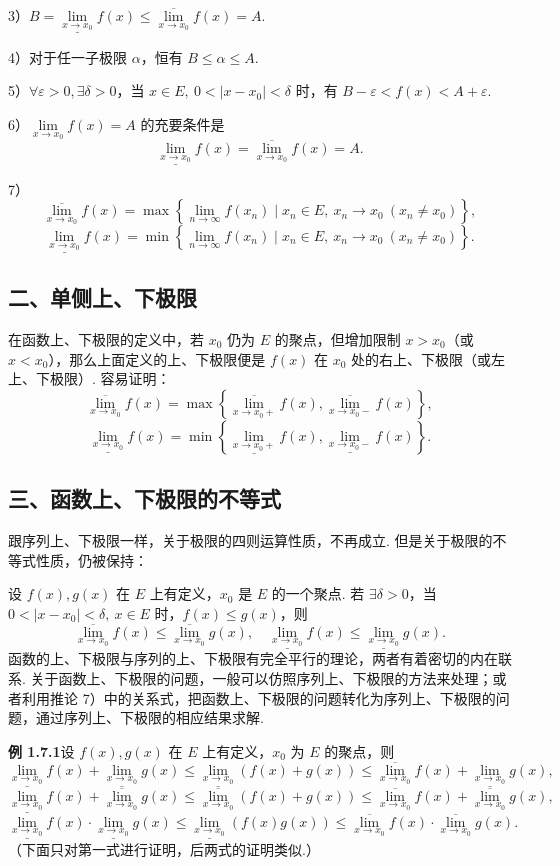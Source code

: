 \documentclass[UTF8,12pt,a4paper,fontset=fandol]{ctexart}
\begin{document}
3）$B=\underline{\lim\limits_{x\to x_0}}f(x)\le \overline{\lim\limits_{x\to x_0}}f(x)=A$.

4）对于任一子极限 $\alpha$，恒有 $B\le\alpha\le A$.

5）$\forall \varepsilon>0,\exists\delta>0$，当 $x\in E,\ 0<|x-x_0|<\delta$ 时，有 $B-\varepsilon<f(x)<A+\varepsilon$.

6）$\lim\limits_{x\to x_0}f(x)=A$ 的充要条件是
\[
  \underline{\lim_{x\to x_0}}f(x)=\overline{\lim_{x\to x_0}}f(x)=A.
\]

7）
\[
  \overline{\lim_{x\to x_0}}f(x)
  =\max\left\{\lim_{n\to\infty}f(x_n)\mid x_n\in E,\ x_n\to x_0\ (x_n\ne x_0)\right\},
\]
\[
  \underline{\lim_{x\to x_0}}f(x)
  =\min\left\{\lim_{n\to\infty}f(x_n)\mid x_n\in E,\ x_n\to x_0\ (x_n\ne x_0)\right\}.
\]

\subsection*{二、单侧上、下极限}

在函数上、下极限的定义中，若 $x_0$ 仍为 $E$ 的聚点，但增加限制 $x>x_0$（或 $x<x_0$），那么上面定义的上、下极限便是 $f(x)$ 在 $x_0$ 处的右上、下极限（或左上、下极限）. 容易证明：
\[
  \overline{\lim_{x\to x_0}}f(x)
  =\max\left\{\overline{\lim_{x\to x_0+}}f(x),\overline{\lim_{x\to x_0-}}f(x)\right\},
\]
\[
  \underline{\lim_{x\to x_0}}f(x)
  =\min\left\{\underline{\lim_{x\to x_0+}}f(x),\underline{\lim_{x\to x_0-}}f(x)\right\}.
\]

\subsection*{三、函数上、下极限的不等式}

跟序列上、下极限一样，关于极限的四则运算性质，不再成立. 但是关于极限的不等式性质，仍被保持：

设 $f(x),g(x)$ 在 $E$ 上有定义，$x_0$ 是 $E$ 的一个聚点. 若 $\exists\delta>0$，当 $0<|x-x_0|<\delta,\ x\in E$ 时，$f(x)\le g(x)$，则
\[
  \overline{\lim_{x\to x_0}}f(x)\le \overline{\lim_{x\to x_0}}g(x),\quad
  \underline{\lim_{x\to x_0}}f(x)\le \underline{\lim_{x\to x_0}}g(x).
\]
函数的上、下极限与序列的上、下极限有完全平行的理论，两者有着密切的内在联系. 关于函数上、下极限的问题，一般可以仿照序列上、下极限的方法来处理；或者利用推论 7）中的关系式，把函数上、下极限的问题转化为序列上、下极限的问题，通过序列上、下极限的相应结果求解.

\noindent\textbf{例 1.7.1}\quad 设 $f(x),g(x)$ 在 $E$ 上有定义，$x_0$ 为 $E$ 的聚点，则
\[
  \underline{\lim_{x\to x_0}}f(x)+\underline{\lim_{x\to x_0}}g(x)
  \le \underline{\lim_{x\to x_0}}(f(x)+g(x))
  \le \overline{\lim_{x\to x_0}}f(x)+\underline{\lim_{x\to x_0}}g(x),
\]
\[
  \underline{\lim_{x\to x_0}}f(x)+\overline{\lim_{x\to x_0}}g(x)
  \le \overline{\lim_{x\to x_0}}(f(x)+g(x))
  \le \overline{\lim_{x\to x_0}}f(x)+\overline{\lim_{x\to x_0}}g(x),
\]
\[
  \underline{\lim_{x\to x_0}}f(x)\cdot\underline{\lim_{x\to x_0}}g(x)
  \le \underline{\lim_{x\to x_0}}(f(x)g(x))
  \le \overline{\lim_{x\to x_0}}f(x)\cdot\overline{\lim_{x\to x_0}}g(x).
\]
（下面只对第一式进行证明，后两式的证明类似.）
\end{document}
